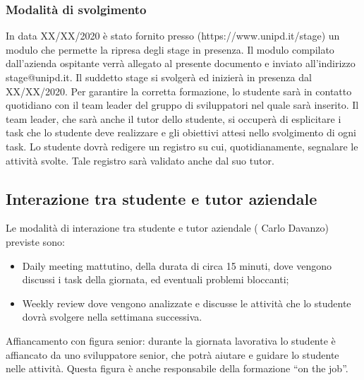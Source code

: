 
\subsubsection{Modalità di svolgimento}
In data XX/XX/2020 è stato fornito presso (https://www.unipd.it/stage) un modulo che permette la ripresa degli stage in presenza. Il modulo compilato dall’azienda ospitante verrà allegato al presente documento e inviato all’indirizzo stage@unipd.it.
Il suddetto stage si svolgerà ed inizierà in presenza dal XX/XX/2020. Per garantire la corretta formazione, lo studente sarà in contatto quotidiano con il team leader del gruppo di sviluppatori
nel quale sarà inserito. Il team leader, che sarà anche il tutor dello studente, si occuperà di
esplicitare i task che lo studente deve realizzare e gli obiettivi attesi nello svolgimento di ogni task.
Lo studente dovrà redigere un registro su cui, quotidianamente, segnalare le attività svolte. Tale
registro sarà validato anche dal suo tutor.

\subsection{Interazione tra studente e tutor aziendale}

Le modalità di interazione tra studente e tutor aziendale ( Carlo Davanzo) previste sono:
	\begin{itemize}
		\item Daily meeting mattutino, della durata di circa 15 minuti, dove vengono discussi i task della giornata, ed eventuali problemi bloccanti;
		\item Weekly review dove vengono analizzate e discusse le attività che lo studente dovrà svolgere nella settimana successiva.
	\end{itemize}
Affiancamento con figura senior: durante la giornata lavorativa lo studente è affiancato da uno sviluppatore senior, che potrà aiutare e guidare lo studente nelle attività. Questa figura è anche responsabile della formazione “on the job”.

\pagebreak